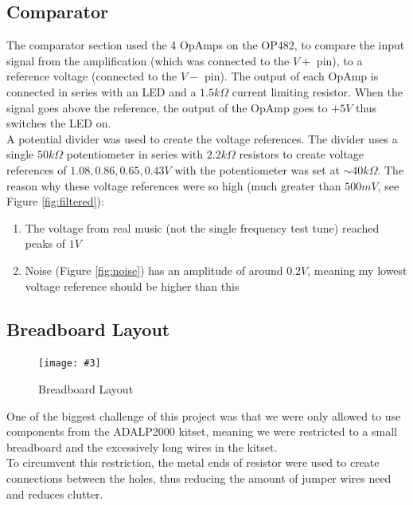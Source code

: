 \documentclass[10pt]{article}
\newcommand{\img}[5]{

    \begin{figure}[h]
        \begin{center}
        \texttt{[image: \#3]} 
         \caption{#4}
        \label{fig:#5}      
        \end{center}
    
    \end{figure}

}
\begin{document}
    \subsection{Comparator}
    
    The comparator section used the 4 OpAmps on the OP482, to compare the input signal from the amplification (which was connected to the $V+$ pin), to a reference voltage (connected to the $V-$ pin). The output of each OpAmp is connected in series with an LED and a $1.5k\Omega$ current limiting resistor.
    When the signal goes above the reference, the output of the OpAmp goes to $+5V$ thus switches the LED on.\\
    A potential divider was used to create the voltage references. The divider uses a single $50k\Omega$ potentiometer in series with $2.2k\Omega$ resistors to create voltage references of $1.08,0.86,0.65,0.43V$ with the potentiometer was set at $\sim40k\Omega$. The reason why these voltage references were so high (much greater than $500mV$, see Figure \ref{fig:filtered}):
    \begin{enumerate}
    \item The voltage from real music (not the single frequency test tune) reached peaks of $1V$
    \item Noise (Figure \ref{fig:noise}) has an amplitude of around $0.2V$, meaning my lowest voltage reference should be higher than this
    \end{enumerate}

    \subsection{Breadboard Layout}
    \img{.7}{.8}{breadboard.jpg}{Breadboard Layout}{breadboard}
    \FloatBarrier
    \noindent
    One of the biggest challenge of this project was that we were only allowed to use components from the ADALP2000 kitset, meaning we were restricted to a small breadboard and the excessively long wires in the kitset.\\
    To circumvent this restriction, the metal ends of resistor were used to create connections between the holes, thus reducing the amount of jumper wires need and reduces clutter.
    

    
    
\end{document}

